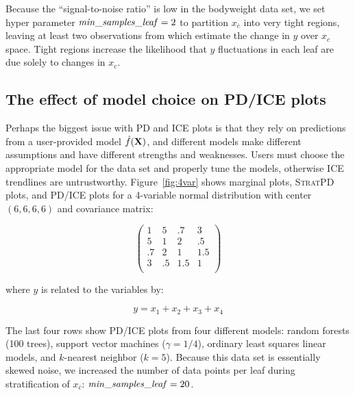 \documentclass[12pt]{article}
\newcommand{\figref}[1]{Figure~\ref{#1}}
\newcommand{\spd}{\fontfamily{cmr}\textsc{\small StratPD}}
\newcommand{\xnc}{$x_{\overline{c}}$}
\begin{document}
Because the ``signal-to-noise ratio'' is low in the bodyweight data set, we set hyper parameter ${\it min\_samples\_leaf}=2$ to partition \xnc{} into very tight regions, leaving at least two observations from which estimate the change in $y$ over $x_c$ space. Tight regions increase the likelihood that $y$ fluctuations in each leaf are due solely to changes in $x_c$.

\subsection{The effect of model choice on PD/ICE plots}

Perhaps the biggest issue with PD and ICE plots is that they rely on predictions from a user-provided model $\hat{f}(\bf X)$, and different models make different assumptions and have different strengths and weaknesses.  Users must choose the appropriate model for the data set and properly tune the models, otherwise ICE trendlines are untrustworthy. \figref{fig:4var} shows marginal plots, \spd{} plots, and PD/ICE plots for a 4-variable normal distribution with center $(6, 6, 6, 6)$ and covariance matrix:

\[
\left(
\begin{array}{cccc}
1 & 5 &.7 & 3\\
5 &1 &2 &.5\\
.7 &2 & 1 & 1.5\\
3 &.5 &1.5 &1\\
\end{array}
\right)
\]

\noindent where $y$ is related to the variables by:

\begin{equation}\label{eq:4var}
y = x_1 + x_2 + x_3 + x_4
\end{equation}

\noindent The last four rows show PD/ICE plots from four different models: random forests (100 trees), support vector machines ($\gamma=1/4$), ordinary least squares linear models, and $k$-nearest neighbor ($k=5$).  Because this data set is essentially skewed noise, we increased the number of data points per leaf during stratification of \xnc{}: ${\it min\_samples\_leaf} = 20$.
\end{document}
